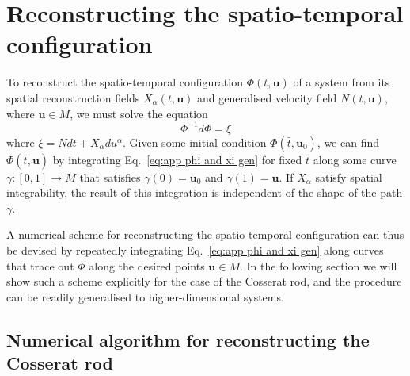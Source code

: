 \documentclass[]{cam-thesis}
\begin{document}
\chapter{Reconstructing the spatio-temporal configuration} \label{app:Reconstructing the spatio-temporal configuration}

To reconstruct the spatio-temporal configuration $\Phi(t, \mathbf{u})$ of a system from its spatial reconstruction fields $X_\alpha(t, \mathbf{u})$ and generalised velocity field $N(t,\mathbf{u})$, where $\mathbf{u} \in M$, we must solve the equation
\begin{equation} \label{eq:app phi and xi gen}
	\Phi^{-1} d \Phi = \xi
\end{equation}
where $\xi = N dt + X_\alpha du^\alpha$. Given some initial condition $\Phi(\bar{t}, \mathbf{u}_0)$, we can find $\Phi(\bar{t},\mathbf{u})$ by integrating Eq.~\ref{eq:app phi and xi gen} for fixed $\bar{t}$ along some curve $\gamma : [0,1] \to M$ that satisfies $\gamma(0) = \mathbf{u}_0$ and $\gamma(1) = \mathbf{u}$. If $X_\alpha$ satisfy spatial integrability, the result of this integration is independent of the shape of the path $\gamma$.

A numerical scheme for reconstructing the spatio-temporal configuration can thus be devised by repeatedly integrating Eq.~\ref{eq:app phi and xi gen} along curves that trace out $\Phi$ along the desired points $\mathbf{u} \in M$. In the following section we will show such a scheme explicitly for the case of the Cosserat rod, and the procedure can be readily generalised to higher-dimensional systems.

\section{Numerical algorithm for reconstructing the Cosserat rod} \label{app:Reconstructing the Cosserat rod from xi}
\end{document}
